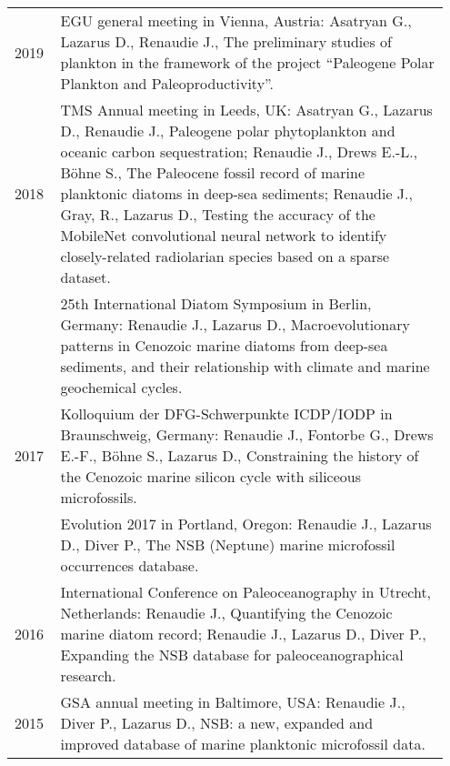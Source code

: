 \documentclass[11pt, a4paper]{article}
\begin{document}
\begin{longtable}{p{0.1\linewidth} P{0.85\linewidth}}
2019 & EGU general meeting in Vienna, Austria: Asatryan G., Lazarus D., Renaudie J., The preliminary studies of plankton in the framework of the project ``Paleogene Polar Plankton and Paleoproductivity''.\\
2018 & TMS Annual meeting in Leeds, UK: Asatryan G., Lazarus D., Renaudie J., Paleogene polar phytoplankton and oceanic carbon sequestration; Renaudie J., Drews E.-L., Böhne S., The Paleocene fossil record of marine planktonic diatoms in deep-sea sediments; Renaudie J., Gray, R., Lazarus D., Testing the accuracy of the MobileNet convolutional neural network to identify closely-related radiolarian species based on a sparse dataset.\\
& 25th International Diatom Symposium in Berlin, Germany: Renaudie J., Lazarus D., Macroevolutionary patterns in Cenozoic marine diatoms from deep-sea sediments, and their relationship with climate and marine geochemical cycles.\\
2017 & Kolloquium der DFG-Schwerpunkte ICDP/IODP in Braunschweig, Germany: Renaudie J., Fontorbe G., Drews E.-F., Böhne S., Lazarus D., Constraining the history of the Cenozoic marine silicon cycle with siliceous microfossils.\\
 & Evolution 2017 in Portland, Oregon: Renaudie J., Lazarus D., Diver P., The NSB (Neptune) marine microfossil occurrences database.\\
2016 %
 & International Conference on Paleoceanography in Utrecht, Netherlands: Renaudie J., Quantifying the Cenozoic marine diatom record; Renaudie J., Lazarus D., Diver P., Expanding the NSB database for paleoceanographical research.\\
2015 %
 & GSA annual meeting in Baltimore, USA: Renaudie J., Diver P., Lazarus D., NSB: a new, expanded and improved database of marine planktonic microfossil data.\\

\end{longtable}
\end{document}
